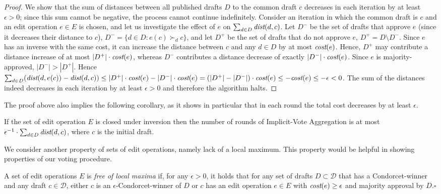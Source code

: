 \documentclass[sigconf]{aamas}  %
\newcommand{\qqed}{\hfill$\square$}
\newcommand{\calD}{\mathcal{D}}
\newcommand{\prefers}[1]{\succ_{#1}}
\newcommand{\dist}{\emph{dist}}
\newcommand{\cost}{\emph{cost}}
\begin{document}
\begin{proof}
%
We show that the sum of distances between all published drafts $D$ to the common draft $c$ decreases in each iteration by at least $\epsilon >0$; since this sum cannot be negative, the process cannot continue indefinitely. Consider an iteration in which the common draft is $c$ and an edit operation $e \in E$ is chosen, and let us investigate the effect of $e$ on $\sum_{d \in D} \dist(d, c)$.   Let $D^-$ be the  set of drafts that approve $e$ (since it decreases their distance to $c$), $D^- = \{d \in D: e(c) \prefers{d} c\}$,  and let $D^+$ be the set of drafts that do not approve $e$, $D^+ = D \setminus D^-$.  Since $e$ has an inverse with the same cost, it can increase the distance between $c$ and any $d \in D$ by at most $\cost(e)$.
Hence,  $D^+$ may contribute a distance increase of at most $|D^+| \cdot \cost(e)$, whereas  $D^-$  contributes a distance decrease of exactly $|D^-| \cdot \cost(e)$. 
Since $e$ is majority-approved, $|D^-| > |D^+|$.   Hence  $\sum_{d \in D} (\dist(d, e(c)) -\dist(d,c)) \le |D^+| \cdot \cost(e) -  |D^-| \cdot \cost(e)  = (|D^+| - |D^-|) \cdot \cost(e) \le  -\cost(e) \le - \epsilon < 0$.  The sum of the distances indeed decreases in each iteration by at least $\epsilon >0$ and therefore the algorithm halts.
%
\end{proof}

The proof above also implies the following corollary, as it shows in particular that in each round the total cost decreases by at least $\epsilon$.

\begin{corollary}
  If the set of edit operation $E$ is closed under inversion then the number of rounds of Implicit-Vote Aggregation is at most $\epsilon^{-1} \cdot \sum_{d \in D} \dist(d, c)$, where $c$ is the initial draft. 
\end{corollary}

We consider another property of sets of edit operations, namely lack of a local maximum. This property would be helpful in showing properties of our voting procedure.

\begin{definition}
%
A set of edit operations $E$ is \emph{free of local maxima} if, for any $\epsilon > 0$, it holds that for any set of drafts $D \subset \calD$ that has a Condorcet-winner and any draft $c \in \calD$, either $c$ is an $\epsilon$-Condorcet-winner of $D$ or $c$ has an edit operation $e \in E$ with $\cost(e) \ge \epsilon$ and majority approval by $D$.\qqed
%
\end{definition}
\end{document}

